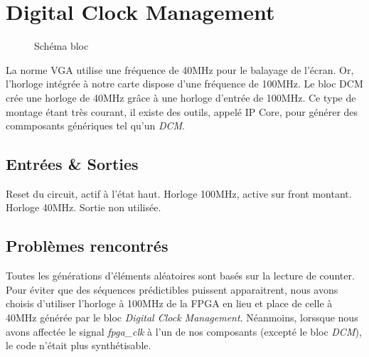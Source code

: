 \documentclass[french]{nakrule}
\begin{document}
\clearpage

\section{Digital Clock Management}
\label{sec:dcm}

\begin{figure}
\caption{Schéma bloc}
\label{dcmBloc}
\end{figure}

La norme VGA utilise une fréquence de 40MHz pour le balayage de l’écran. Or,
l’horloge intégrée à notre carte dispose d’une fréquence de 100MHz. Le bloc DCM
crée une horloge de 40MHz grâce à une horloge d'entrée de 100MHz.
Ce type de montage étant très courant, il existe des outils, appelé IP Core,
pour générer des commposants génériques tel qu'un \emph{DCM}. 
\vspace{.4in}

\subsection{Entrées \& Sorties}
\label{subsec:Entrees_Sorties_dmc}

\begin{descr}
   Reset du circuit, actif à l'état haut.
   Horloge 100MHz, active sur front montant.
   Horloge 40MHz.
   Sortie non utilisée.
\end{descr}


\subsection{Problèmes rencontrés}
\label{subsec:Problemes_rencontres_dcm}

Toutes les générations d'éléments aléatoires sont basés sur la lecture de
counter. Pour éviter que des séquences prédictibles puissent apparaitrent, nous
avons choisis d'utiliser l'horloge à 100MHz de la FPGA en lieu et place de celle
à 40MHz générée par le bloc \emph{Digital Clock Management}. Néanmoins, lorssque
nous avons affectée le signal \emph{fpga\_clk} à l'un de nos composants (excepté
le bloc \emph{DCM}), le code n'était plus synthétisable.
\end{document}

